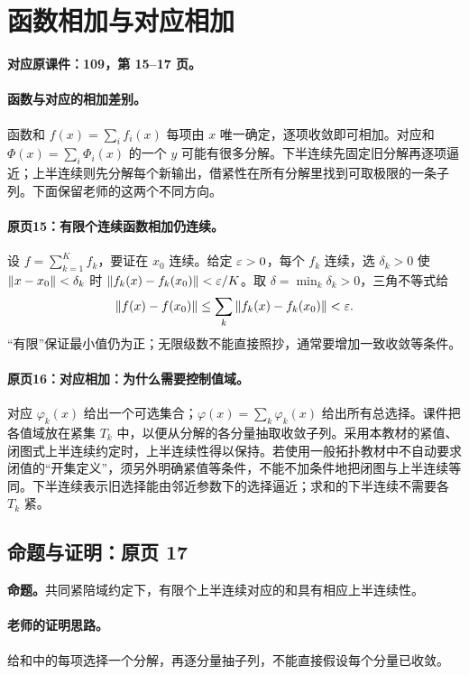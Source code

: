 \clearpage\section{函数相加与对应相加}\label{g:109:15}

\textbf{对应原课件：109，第 15--17 页。}


\paragraph{函数与对应的相加差别。}
函数和 $f(x)=\sum_i f_i(x)$ 每项由 $x$ 唯一确定，逐项收敛即可相加。对应和 $\Phi(x)=\sum_i\Phi_i(x)$ 的一个 $y$ 可能有很多分解。下半连续先固定旧分解再逐项逼近；上半连续则先分解每个新输出，借紧性在所有分解里找到可取极限的一条子列。下面保留老师的这两个不同方向。


\paragraph{原页15：有限个连续函数相加仍连续。}设 $f=\sum_{k=1}^K f_k$，要证在 $x_0$ 连续。给定 $\varepsilon>0$，每个 $f_k$ 连续，选 $\delta_k>0$ 使 $\left\lVert x-x_0\right\rVert<\delta_k$ 时 $\left\lVert f_k(x)-f_k(x_0)\right\rVert<\varepsilon/K$。取 $\delta=\min_k\delta_k>0$，三角不等式给
\[\left\lVert f(x)-f(x_0)\right\rVert\le\sum_k\left\lVert f_k(x)-f_k(x_0)\right\rVert<\varepsilon.\]
“有限”保证最小值仍为正；无限级数不能直接照抄，通常要增加一致收敛等条件。



\paragraph{原页16：对应相加：为什么需要控制值域。}对应 $\varphi_k(x)$ 给出一个可选集合；$\varphi(x)=\sum_k\varphi_k(x)$ 给出所有总选择。课件把各值域放在紧集 $T_k$ 中，以便从分解的各分量抽取收敛子列。采用本教材的紧值、闭图式上半连续约定时，上半连续性得以保持。若使用一般拓扑教材中不自动要求闭值的“开集定义”，须另外明确紧值等条件，不能不加条件地把闭图与上半连续等同。下半连续表示旧选择能由邻近参数下的选择逼近；求和的下半连续不需要各 $T_k$ 紧。



\subsection{命题与证明：原页 17}

\textbf{命题。}共同紧陪域约定下，有限个上半连续对应的和具有相应上半连续性。

\paragraph{老师的证明思路。}给和中的每项选择一个分解，再逐分量抽子列，不能直接假设每个分量已收敛。

